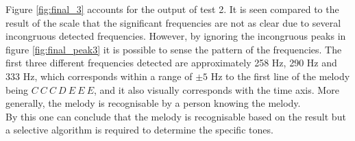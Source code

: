 Figure \ref{fig:final_3} accounts for the output of test 2. It is seen compared to the result of the scale that the significant frequencies are not as clear due to several incongruous detected frequencies. However, by ignoring the incongruous peaks in figure \ref{fig:final_peak3} it is possible to sense the pattern of the frequencies. The first three different frequencies detected are approximately 258 Hz, 290 Hz and 333 Hz, which corresponds within a range of $\pm 5$ Hz to the first line of the melody being $C \ C \ C \ D \ E \ E \ E$, and it also visually corresponds with the time axis. More generally, the melody is recognisable by a person knowing the melody. \\
By this one can conclude that the melody is recognisable based on the result but a selective algorithm is required to determine the specific tones.                  

